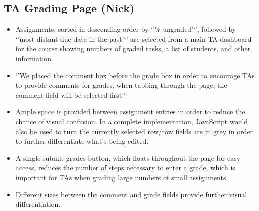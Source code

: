 \subsection{TA Grading Page (Nick)}

\begin{itemize}
\item Assignments, sorted in descending order by `'\% ungraded'`', followed by `'most distant due date in the past'`' are selected from a main TA dashboard for the course showing numbers of graded tasks, a list of students, and other information.

\item `'We placed the comment box before the grade box in order to encourage TAs to provide comments for grades; when tabbing through the page, the comment field will be selected first'`

\item Ample space is provided between assignment entries in order to reduce the chance of visual confusion. In a complete implementation, JavaScript would also be used to turn the currently selected row/row fields are in grey in order to further differentiate what's being edited.

\item A single submit grades button, which floats throughout the page for easy access, reduces the number of steps necessary to enter a grade, which is important for TAs when grading large numbers of small assignments.

\item Different sizes between the comment and grade fields provide further visual differentiation.
\end{itemize}
